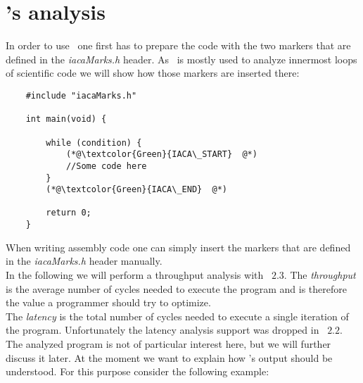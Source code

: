\section{\iaca's analysis} 

In order to use \iaca\ one first has to prepare the code with the two markers that are defined in the \emph{iacaMarks.h} header. As \iaca\ is mostly used to analyze innermost loops of scientific code we will show how those markers are inserted there:

\begin{mdframed}[backgroundcolor=light-gray, roundcorner=10pt,leftmargin=1, rightmargin=1, innerleftmargin=15, innertopmargin=1,innerbottommargin=1, outerlinewidth=1, linecolor=light-gray]
    \begin{lstlisting}
    #include "iacaMarks.h"
    
    int main(void) {
    
        while (condition) {
            (*@\textcolor{Green}{IACA\_START}  @*)
            //Some code here
        }
        (*@\textcolor{Green}{IACA\_END}  @*)
    
        return 0;
    }
    \end{lstlisting}
\end{mdframed}

When writing assembly code one can simply insert the markers that are defined in the \emph{iacaMarks.h} header manually.\\
In the following we will perform a throughput analysis with \iaca\ $2.3$. The \emph{throughput} is the average number of cycles needed to execute the program and is therefore the value a programmer should try to optimize.\\ 
The \emph{latency} is the total number of cycles needed to execute a single iteration of the program. Unfortunately the latency analysis support was dropped in \iaca\ $2.2$.\\
The analyzed program is not of particular interest here, but we will further discuss it later.  At the moment we want to explain how \iaca's output should be understood. For this purpose consider the following example:

